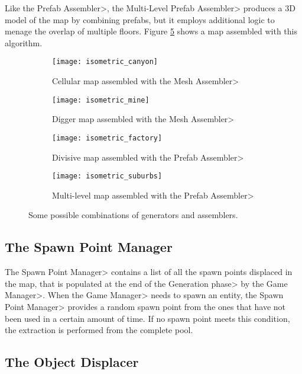 Like the \<Prefab Assembler>, the \<Multi-Level Prefab Assembler> produces a 3D model of the map by combining prefabs, but it employs additional logic to menage the overlap of multiple floors. Figure \ref{fig:multi_assembled} shows a map assembled with this algorithm.

\begin{figure}
\centering
\begin{subfigure}[t]{0.48\linewidth}
\texttt{[image: isometric\_canyon]}
\caption{Cellular map assembled with the \<Mesh Assembler>}
\label{fig:cellular_assembled}
\end{subfigure}
\begin{subfigure}[t]{0.48\linewidth}
\texttt{[image: isometric\_mine]}
\caption{Digger map assembled with the \<Mesh Assembler>}
\label{fig:digger_assembled}
\end{subfigure}
\begin{subfigure}[t]{0.48\linewidth}
\texttt{[image: isometric\_factory]}
\caption{Divisive map assembled with the \<Prefab Assembler>}
\label{fig:divisive_assembled}
\end{subfigure}
\begin{subfigure}[t]{0.48\linewidth}
\texttt{[image: isometric\_suburbs]}
\caption{Multi-level map assembled with the \<Prefab Assembler>}
\label{fig:multi_assembled}
\end{subfigure}
\caption{Some possible combinations of generators and assemblers.}
\end{figure}


\subsection{The Spawn Point Manager}

The \<Spawn Point Manager> contains a list of all the spawn points displaced in the map, that is populated at the end of the \<Generation phase> by the \<Game Manager>. When the \<Game Manager> needs to spawn an entity, the \<Spawn Point Manager> provides a random spawn point from the ones that have not been used in a certain amount of time. If no spawn point meets this condition, the extraction is performed from the complete pool.


\subsection{The Object Displacer}

